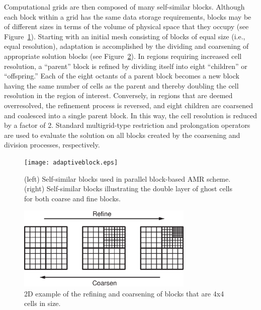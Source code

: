 Computational grids are then composed of many self-similar blocks. Although
each block within a grid has the same data storage requirements, blocks may be
of different sizes in terms of the volume of physical space that they
occupy (see Figure~\ref{fig:blocks}).
Starting with an initial mesh consisting of blocks of equal size (i.e., equal
resolution), adaptation is accomplished by the dividing and coarsening of
appropriate solution blocks (see Figure~\ref{fig:refine_coarsen}).  In regions
requiring 
increased cell resolution, a
``parent'' block is refined by dividing itself into eight ``children'' or
``offspring.''  Each of the eight octants of a parent block becomes a new block
having the same number of cells as the parent and thereby doubling the cell
resolution in the region of interest. Conversely, in regions that are deemed
overresolved, the refinement process is reversed, and eight children are
coarsened and coalesced into a single parent block.  In this way, the cell
resolution is reduced by a factor of 2. Standard multigrid-type restriction
and prolongation operators are used to evaluate the solution on all blocks
created by the coarsening and division processes, respectively.
\begin{figure}
\begin{center}
\texttt{[image: adaptiveblock.eps]}
\end{center}
\caption{(left) Self-similar blocks used in parallel block-based AMR
           scheme. (right) Self-similar blocks illustrating the double
           layer of ghost cells for both coarse and fine blocks.}
\label{fig:blocks}
\end{figure}
\begin{figure}
\begin{center}
\includegraphics*[width=8.4cm]{adapted_grid.eps}
\end{center}
\caption{2D example of the refining and coarsening of blocks that are
4x4 cells in size.}
\label{fig:refine_coarsen}
\end{figure}

